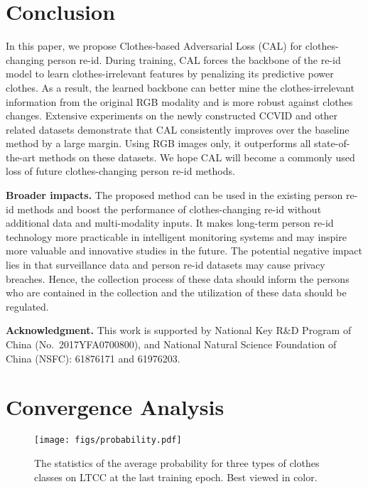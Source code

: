 \documentclass[10pt,twocolumn,letterpaper]{article}
\begin{document}
\section{Conclusion}
In this paper, we propose Clothes-based Adversarial Loss (CAL) for clothes-changing person re-id.
During training, CAL forces the backbone of the re-id model to learn clothes-irrelevant features by penalizing its predictive power \wrt clothes.
As a result, the learned backbone can better mine the clothes-irrelevant information from the original RGB modality and is more robust against clothes changes.
Extensive experiments on the newly constructed CCVID and other related datasets demonstrate that CAL consistently improves over the baseline method by a large margin.
Using RGB images only, it outperforms all state-of-the-art methods on these datasets.
We hope CAL will become a commonly used loss of future clothes-changing person re-id methods.

\medskip
\noindent
\textbf{Broader impacts.}
The proposed method can be used in the existing person re-id methods and boost the performance of clothes-changing re-id without additional data and multi-modality inputs. It makes long-term person re-id technology more practicable in intelligent monitoring systems and may inspire more valuable and innovative studies in the future.
The potential negative impact lies in that surveillance data and person re-id datasets may cause privacy breaches.
Hence, the collection process of these data should inform the persons who are contained in the collection and the utilization of these data should be regulated.

\medskip
\noindent
\textbf{Acknowledgment.}
This work is supported by National Key R\&D Program of China (No.~2017YFA0700800), and National Natural Science Foundation of China (NSFC): 61876171 and 61976203.



\clearpage
\appendix


\section{Convergence Analysis}

\begin{figure}[h]
	\centering
	\texttt{[image: figs/probability.pdf]}\\
	\vspace{-10pt}
	\caption{The statistics of the average probability for three types of clothes classes on LTCC at the last training epoch. Best viewed in color.}
	\vspace{-5pt}
	\label{fig:probability}
\end{figure}
\end{document}
